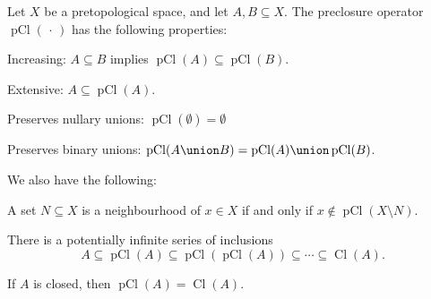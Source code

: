 \documentclass[article, a4paper, 11pt, oneside]{memoir}
\numberwithin{equation}{chapter}
\newcommand{\pCl}[1]{\operatorname{pCl}(#1)}
\renewcommand{\closure}[1]{\operatorname{Cl}(#1)}
\begin{document}
\begin{proposition}
    Let $X$ be a pretopological space, and let $A,B \subseteq X$. The preclosure operator $\pCl{\,\cdot\,}$ has the following properties:
    \begin{enumprop}
        \item \label{enum:preclosure-increasing} Increasing: $A \subseteq B$ implies $\pCl{A} \subseteq \pCl{B}$.
        
        \item \label{enum:preclosure-extensive} Extensive: $A \subseteq \pCl{A}$.
        
        \item \label{enum:preclosure-nullary-unions} Preserves nullary unions: $\pCl{\emptyset} = \emptyset$
        
        \item \label{enum:preclosure-binary-unions} Preserves binary unions: $\pCl{A \union B} = \pCl{A} \union \pCl{B}$.
    \end{enumprop}
    We also have the following:
    \begin{enumprop}[resume]
        \item \label{enum:preclosure-characterisation-of-nhoods} A set $N \subseteq X$ is a neighbourhood of $x \in X$ if and only if $x \not\in \pCl{X \setminus N}$.

        \item \label{enum:preclosure-inclusion-series} There is a potentially infinite series of inclusions
        \begin{equation*}
            A
                \subseteq \pCl{A}
                \subseteq \pCl{\pCl{A}}
                \subseteq \cdots
                \subseteq \closure{A}.
        \end{equation*}
        
        \item \label{enum:preclosure-equals-closure} If $A$ is closed, then $\pCl{A} = \closure{A}$.
    \end{enumprop}
\end{proposition}
\end{document}
